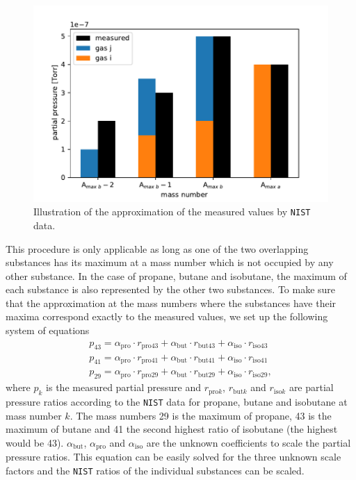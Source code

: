 \begin{figure}[h!]
    \centering
    \includegraphics[width=\textwidth]{Report/DataResultsPlots/ilustration_nist_approx1.pdf}
    \caption{Illustration of the approximation of the measured values by \texttt{NIST} data. }
    \label{fig:illustration_nist1}
\end{figure}

This procedure is only applicable as long as one of the two overlapping substances has its maximum at a mass number which is not occupied by any other substance.  In the case of propane, butane and isobutane, the maximum of each substance is also represented by the other two substances. To make sure that the approximation at the mass numbers where the substances have their maxima correspond exactly to the measured values, we set up the following system of equations  
\begin{align} \label{eq:coef1}
    p_{43} = \alpha_{\mathrm{pro}}\cdot r_\mathrm{pro43} + \alpha_\mathrm{but} \cdot r_\mathrm{but43} + \alpha_\mathrm{iso}\cdot r_\mathrm{iso43} \\
    \label{eq:coef2}
    p_{41} = \alpha_{\mathrm{pro}}\cdot r_\mathrm{pro41} + \alpha_\mathrm{but} \cdot r_\mathrm{but41} + \alpha_\mathrm{iso}\cdot r_\mathrm{iso41} \\
    \label{eq:coef3}
    p_{29} = \alpha_{\mathrm{pro}}\cdot r_\mathrm{pro29} + \alpha_\mathrm{but} \cdot r_\mathrm{but29} + \alpha_\mathrm{iso}\cdot r_\mathrm{iso29},
\end{align}
where $p_k$ is the measured partial pressure and $r_{\mathrm{pro}k}$, $r_{\mathrm{but}k}$ and $r_{\mathrm{iso}k}$ are partial pressure ratios according to the \texttt{NIST} data for propane, butane and isobutane at mass number $k$. The mass numbers 29 is the maximum of propane, 43 is the maximum of butane and 41 the second highest ratio of isobutane (the highest would be 43). $\alpha_\mathrm{but}$, $\alpha_\mathrm{pro}$ and $\alpha_\mathrm{iso}$ are the unknown coefficients to scale the partial pressure ratios. This equation can be easily solved for the three unknown scale factors and the \texttt{NIST} ratios of the individual substances can be scaled.  


